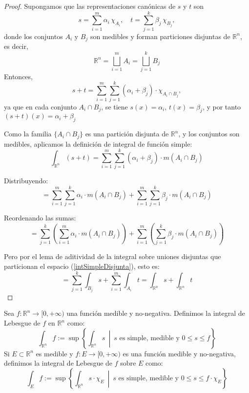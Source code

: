 \begin{proof}
    Supongamos que las representaciones canónicas de \( s \) y \( t \) son
    \[
        s = \sum_{i=1}^{m} \alpha_i \, \chi_{A_i}, \quad
        t = \sum_{j=1}^{k} \beta_j \, \chi_{B_j},
    \]
    donde los conjuntos \( A_i \) y \( B_j \) son medibles y forman particiones
    disjuntas de \( \mathbb{R}^n \), es decir,
    \[
        \mathbb{R}^n = \bigsqcup_{i=1}^{m} A_i = \bigsqcup_{j=1}^{k} B_j
    \]
    Entonces,
    \[
        s + t = \sum_{i=1}^{m} \sum_{j=1}^{k} (\alpha_i + \beta_j) \cdot \chi_{A_i \cap B_j},
    \]
    ya que en cada conjunto \( A_i \cap B_j \), se tiene \( s(x) = \alpha_i \), \(
    t(x) = \beta_j \), y por tanto \( (s + t)(x) = \alpha_i + \beta_j \)

    Como la familia \( \{ A_i \cap B_j \} \) es una partición disjunta de \(
    \mathbb{R}^n \), y los conjuntos son medibles, aplicamos la definición de
    integral de función simple:
    \[
        \int_{\mathbb{R}^n}(s + t) = \sum_{i=1}^{m} \sum_{j=1}^{k} (\alpha_i + \beta_j) \cdot m(A_i \cap B_j)
    \]

    Distribuyendo:
    \[
        = \sum_{i=1}^{m} \sum_{j=1}^{k} \alpha_i \cdot m(A_i \cap B_j)
        + \sum_{i=1}^{m} \sum_{j=1}^{k} \beta_j \cdot m(A_i \cap B_j)
    \]

    Reordenando las sumas:
    \[
        = \sum_{j=1}^{k} \left( \sum_{i=1}^{m} \alpha_i \cdot m(A_i \cap B_j) \right)
        + \sum_{i=1}^{m} \left( \sum_{j=1}^{k} \beta_j \cdot m(A_i \cap B_j) \right)
    \]

    Pero por el lema de aditividad de la integral sobre uniones disjuntas que
    particionan el espacio (\cref{intSimpleDisjunta}), esto es:
    \[
        = \sum_{j=1}^{k} \int_{B_j} s + \sum_{i=1}^{m} \int_{A_i} t
        = \int_{\mathbb{R}^n} s + \int_{\mathbb{R}^n} t
    \]
\end{proof}

\begin{definición}
Sea $f: \mathbb{R}^n \to [0, +\infty)$ una función medible y no-negativa. Definimos la integral de Lebesgue de $f$ en $\mathbb{R}^n$ como:
$$\int_{\mathbb{R}^n} f := \sup \left\{ \int_{\mathbb{R}^n} s \ \middle| \ s \text{ es simple, medible y } 0 \leq s \leq f \right\}$$
Si $E \subset \mathbb{R}^n$ es medible y $f: E \to [0, +\infty)$ es una función medible y no-negativa, definimos la integral de Lebesgue de $f$ sobre $E$ como:
$$\int_E f := \sup \left\{ \int_{\mathbb{R}^n} s \cdot \chi_E \ \middle| \ s \text{ es simple, medible y } 0 \leq s \leq f \cdot \chi_E \right\}$$\label{Integral de Lebesgue}
\end{definición}

